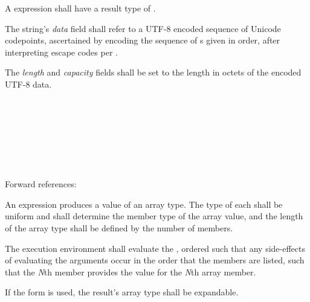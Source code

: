 \specsubsubitem
A  expression shall have a result type of
 .

\specsubsubitem
The string's \textit{data} field shall refer to a UTF-8 encoded sequence of
Unicode codepoints, ascertained by encoding the sequence of
s given in order, after interpreting escape codes per
.

\specsubsubitem
The \textit{length} and \textit{capacity} fields shall be set to the length in
octets of the encoded UTF-8 data.


\begin{grammar}
 \\
	\terminal{[}  \terminal{]} \\

 \\
	 \optional{\terminal{,}} \\
	  \optional{\terminal{,}} \\
	 \terminal{,}  \\
\end{grammar}

Forward references: 

\specsubsubitem
An  expression produces a value of an array type.
The type of each  shall be uniform and shall
determine the member type of the array value, and the length of the array type
shall be defined by the number of members.

\specsubsubitem
The execution environment shall evaluate the ,
ordered such that any side-effects of evaluating the arguments occur in the
order that the members are listed, such that the \textit{N}th member provides
the value for the \textit{N}th array member.

\specsubsubitem
If the  form is used, the result's array type shall be expandable.


